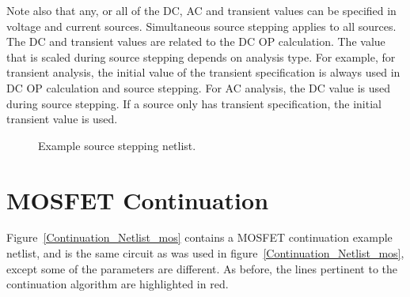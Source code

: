 Note also that any, or all of the DC, AC and transient values can be specified in voltage
and current sources. Simultaneous source stepping applies to all sources. The DC and transient
values are related to the DC OP calculation. The value that is scaled during
source stepping depends on analysis type. For example, for transient analysis, the initial
value of the transient specification is always used in DC OP calculation and source 
stepping. For AC analysis, the DC value is used during source stepping. If a source only has
transient specification, the initial transient value is used.

\begin{figure}[htbp]
\begin{centering}
\caption [Example source stepping netlist.]{Example source stepping netlist. 
\label  {sourceStep_netlist}}
\end{centering}
\end{figure}

\newpage 
\section{MOSFET Continuation}
\label{continuation_mosfet}

Figure~\ref{Continuation_Netlist_mos} contains a MOSFET continuation example netlist, and is the same circuit as was used in figure~\ref{Continuation_Netlist_mos}, except some of the parameters are different.  As before, the lines pertinent to the continuation algorithm are highlighted in red.  

